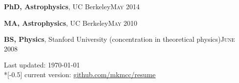 \documentclass[11pt]{article}
\newcommand{\til}{\char158}
\newcommand{\mysection}[1]{%
  \currentpdfbookmark{#1}{#1}
  \noindent{\Large \color{webbrown} \textsc{#1}}\\[-2ex]
  {\color{halfgray} \hrule}
  \vspace*{1ex}}
\begin{document}
\vspace*{\baselineskip}

\textbf{PhD, Astrophysics}, UC Berkeley\hfill\textsc{{May 2014}}
%

\textbf{MA, Astrophysics}, UC Berkeley\hfill\textsc{{May 2010}}
%

\textbf{BS, Physics}, Stanford University (concentration in
theoretical physics)\hfill\textsc{{June 2008}}
%
%


\enlargethispage{4\baselineskip}
\vfill
\begin{minipage}[h!]{\linewidth}
  \hspace*{\fill}
  \begin{center}
    {\scriptsize  Last updated: \today \\*[-0.5\baselineskip]
      current version: 
      \href{https://github.com/mkmcc/resume/raw/master/resume.pdf}%
      {github.com/mkmcc/resume}}
  \end{center}
  \hspace*{\fill}
\end{minipage}




\end{document}

